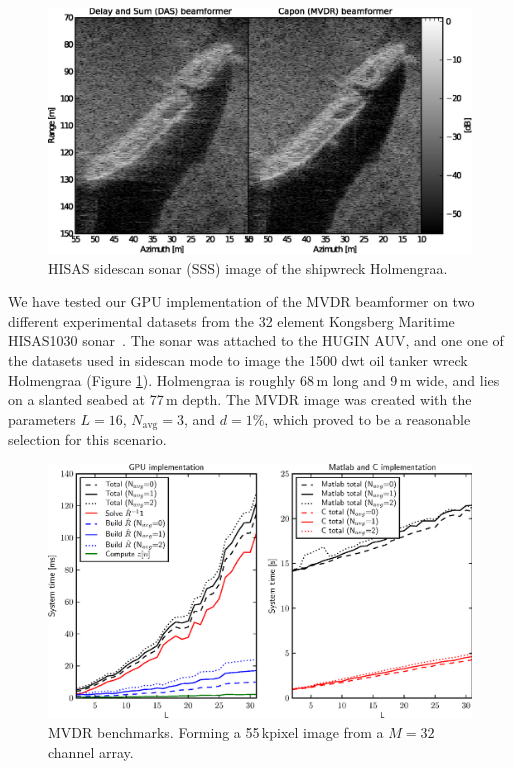 \documentclass[12pt,journal,captionsoff,onecolumn]{IEEEtran}
\let\MYoriglatexcaption\caption               %
\renewcommand{\caption}[2][\relax]{\MYoriglatexcaption[#2]{#2}}
\newcommand\Fig[1]{Figure \ref{#1}}
\newcommand\1{\vec 1}
\begin{document}
\begin{figure}[!t]
\centering
\includegraphics[width=\linewidth]{gfx/img_holmengraa.ps}
\caption{HISAS sidescan sonar (SSS) image of the shipwreck Holmengraa.}\label{holmengraa}
\end{figure}

We have tested our \gls{GPU} implementation of the \gls{MVDR} beamformer on two different experimental datasets from the 32 element Kongsberg Maritime HISAS1030 sonar~\cite{Hansen2009}. The sonar was attached to the HUGIN \gls{AUV}, and one one of the datasets used in sidescan mode to image the 1500 dwt oil tanker wreck Holmengraa (\Fig{holmengraa}). Holmengraa is roughly 68\,m long and 9\,m wide, and lies on a slanted seabed at 77\,m depth. The \gls{MVDR} image was created with the parameters $L=16$, $N_\text{avg}=3$, and $d=1\%$, which proved to be a reasonable selection for this scenario.

\begin{figure}[!t]
\centering
\includegraphics[width=\linewidth]{gfx/benchmark.ps}
\caption{\protect\gls{MVDR} benchmarks. Forming a 55\,kpixel image from a $M=32$ channel array.}\label{benchmarks}
\end{figure}
\end{document}
